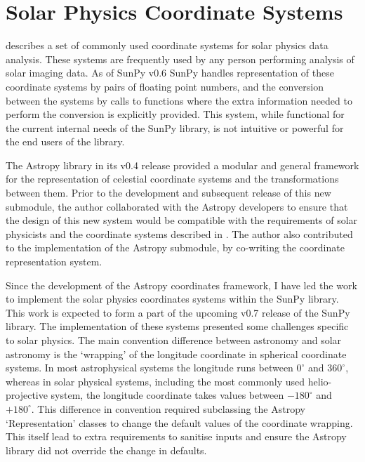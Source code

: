 \section{Solar Physics Coordinate Systems}

\cite{thompson2006} describes a set of commonly used coordinate systems for solar physics data analysis.
These systems are frequently used by any person performing analysis of solar imaging data.
As of SunPy v0.6 SunPy handles representation of these coordinate systems by pairs of floating point numbers, and the conversion between the systems by calls to functions where the extra information needed to perform the conversion is explicitly provided.
This system, while functional for the current internal needs of the SunPy library, is not intuitive or powerful for the end users of the library.

The Astropy library \citep{theastropycollaboration2013} in its v0.4 release provided a modular and general framework for the representation of celestial coordinate systems and the transformations between them.
Prior to the development and subsequent release of this new submodule, the author collaborated with the Astropy developers to ensure that the design of this new system would be compatible with the requirements of solar physicists and the coordinate systems described in \cite{thompson2006}.
The author also contributed to the implementation of the Astropy submodule, by co-writing the coordinate representation system.

Since the development of the Astropy coordinates framework, I have led the work to implement the solar physics coordinates systems within the SunPy library.
This work is expected to form a part of the upcoming v0.7 release of the SunPy library.
The implementation of these systems presented some challenges specific to solar physics.
The main convention difference between astronomy and solar astronomy is the `wrapping' of the longitude coordinate in spherical coordinate systems.
In most astrophysical systems the longitude runs between $0^\circ$ and $360^\circ$, whereas in solar physical systems, including the most commonly used helio-projective system, the longitude coordinate takes values between $-180^\circ$ and $+180^\circ$.
This difference in convention required subclassing the Astropy `Representation' classes to change the default values of the coordinate wrapping.
This itself lead to extra requirements to sanitise inputs and ensure the Astropy library did not override the change in defaults.

